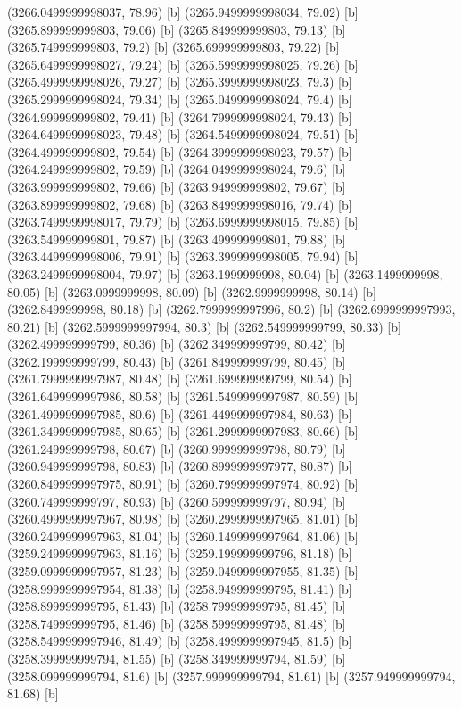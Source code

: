 {{{(3266.0499999998037, 78.96) [b] 
(3265.9499999998034, 79.02) [b] 
(3265.899999999803, 79.06) [b] 
(3265.849999999803, 79.13) [b] 
(3265.749999999803, 79.2) [b] 
(3265.699999999803, 79.22) [b] 
(3265.6499999998027, 79.24) [b] 
(3265.5999999998025, 79.26) [b] 
(3265.4999999998026, 79.27) [b] 
(3265.3999999998023, 79.3) [b] 
(3265.2999999998024, 79.34) [b] 
(3265.0499999998024, 79.4) [b] 
(3264.999999999802, 79.41) [b] 
(3264.7999999998024, 79.43) [b] 
(3264.6499999998023, 79.48) [b] 
(3264.5499999998024, 79.51) [b] 
(3264.499999999802, 79.54) [b] 
(3264.3999999998023, 79.57) [b] 
(3264.249999999802, 79.59) [b] 
(3264.0499999998024, 79.6) [b] 
(3263.999999999802, 79.66) [b] 
(3263.949999999802, 79.67) [b] 
(3263.899999999802, 79.68) [b] 
(3263.8499999998016, 79.74) [b] 
(3263.7499999998017, 79.79) [b] 
(3263.6999999998015, 79.85) [b] 
(3263.549999999801, 79.87) [b] 
(3263.499999999801, 79.88) [b] 
(3263.4499999998006, 79.91) [b] 
(3263.3999999998005, 79.94) [b] 
(3263.2499999998004, 79.97) [b] 
(3263.1999999998, 80.04) [b] 
(3263.1499999998, 80.05) [b] 
(3263.0999999998, 80.09) [b] 
(3262.9999999998, 80.14) [b] 
(3262.8499999998, 80.18) [b] 
(3262.7999999997996, 80.2) [b] 
(3262.6999999997993, 80.21) [b] 
(3262.5999999997994, 80.3) [b] 
(3262.549999999799, 80.33) [b] 
(3262.499999999799, 80.36) [b] 
(3262.349999999799, 80.42) [b] 
(3262.199999999799, 80.43) [b] 
(3261.849999999799, 80.45) [b] 
(3261.7999999997987, 80.48) [b] 
(3261.699999999799, 80.54) [b] 
(3261.6499999997986, 80.58) [b] 
(3261.5499999997987, 80.59) [b] 
(3261.4999999997985, 80.6) [b] 
(3261.4499999997984, 80.63) [b] 
(3261.3499999997985, 80.65) [b] 
(3261.2999999997983, 80.66) [b] 
(3261.249999999798, 80.67) [b] 
(3260.999999999798, 80.79) [b] 
(3260.949999999798, 80.83) [b] 
(3260.8999999997977, 80.87) [b] 
(3260.8499999997975, 80.91) [b] 
(3260.7999999997974, 80.92) [b] 
(3260.749999999797, 80.93) [b] 
(3260.599999999797, 80.94) [b] 
(3260.4999999997967, 80.98) [b] 
(3260.2999999997965, 81.01) [b] 
(3260.2499999997963, 81.04) [b] 
(3260.1499999997964, 81.06) [b] 
(3259.2499999997963, 81.16) [b] 
(3259.199999999796, 81.18) [b] 
(3259.0999999997957, 81.23) [b] 
(3259.0499999997955, 81.35) [b] 
(3258.9999999997954, 81.38) [b] 
(3258.949999999795, 81.41) [b] 
(3258.899999999795, 81.43) [b] 
(3258.799999999795, 81.45) [b] 
(3258.749999999795, 81.46) [b] 
(3258.599999999795, 81.48) [b] 
(3258.5499999997946, 81.49) [b] 
(3258.4999999997945, 81.5) [b] 
(3258.399999999794, 81.55) [b] 
(3258.349999999794, 81.59) [b] 
(3258.099999999794, 81.6) [b] 
(3257.999999999794, 81.61) [b] 
(3257.949999999794, 81.68) [b] 
}}}
